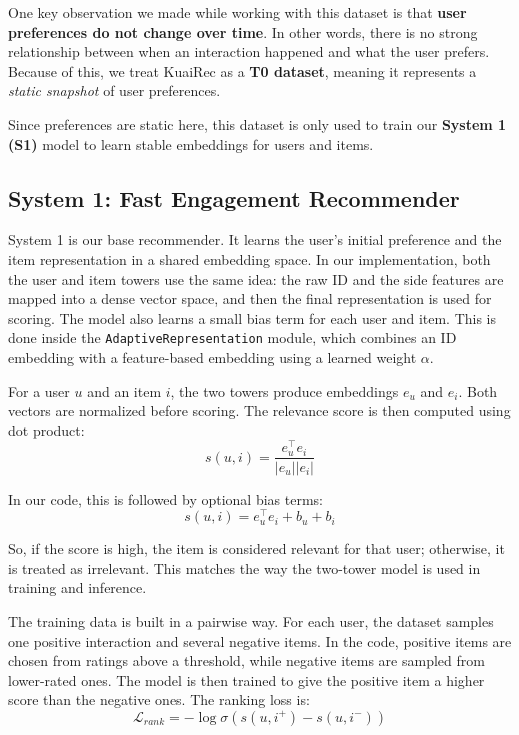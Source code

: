 One key observation we made while working with this dataset is that \textbf{user preferences do not change over time}. 
In other words, there is no strong relationship between when an interaction happened and what the user prefers. 
Because of this, we treat KuaiRec as a \textbf{T0 dataset}, meaning it represents a \textit{static snapshot} of user preferences.

Since preferences are static here, this dataset is only used to train our \textbf{System 1 (S1)} model to learn stable embeddings for users and items. 


\subsection{System 1: Fast Engagement Recommender}

System 1 is our base recommender. 
It learns the user's initial preference and the item representation in a shared embedding space. 
In our implementation, both the user and item towers use the same idea: 
the raw ID and the side features are mapped into a dense vector space, and then the final representation is used for scoring. 
The model also learns a small bias term for each user and item. 
This is done inside the \texttt{AdaptiveRepresentation} module, 
which combines an ID embedding with a feature-based embedding using a learned weight $\alpha$.

For a user $u$ and an item $i$, the two towers produce embeddings $e_u$ and $e_i$. 
Both vectors are normalized before scoring. 
The relevance score is then computed using dot product:
\begin{equation}
    s(u,i) = \frac{e_u^\top e_i}{|e_u||e_i|}    
\end{equation}

In our code, this is followed by optional bias terms:
\begin{equation}
    s(u,i) = e_u^\top e_i + b_u + b_i
\end{equation}

So, if the score is high, the item is considered relevant for that user; otherwise, it is treated as irrelevant. 
This matches the way the two-tower model is used in training and inference.

The training data is built in a pairwise way. 
For each user, the dataset samples one positive interaction and several negative items. 
In the code, positive items are chosen from ratings above a threshold, while negative items are sampled from lower-rated ones. 
The model is then trained to give the positive item a higher score than the negative ones. The ranking loss is:
\begin{equation}
    \mathcal{L}_{rank} = -\log \sigma(s(u,i^+) - s(u,i^-))
\end{equation}

